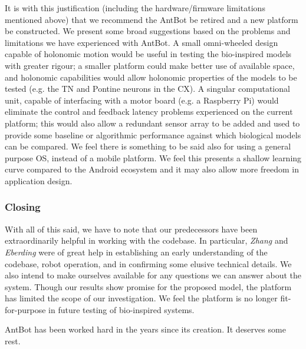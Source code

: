 \documentclass[a4paper,11pt,twoside,openright]{article}
\begin{document}
It is with this justification (including the hardware/firmware
limitations mentioned above) that we recommend the AntBot be retired
and a new platform be constructed. We present some broad suggestions
based on the problems and limitations we have experienced with
AntBot. A small omni-wheeled design capable of holonomic motion would
be useful in testing the bio-inspired models with greater rigour; a
smaller platform could make better use of available space, and
holonomic capabilities would allow holonomic properties of the models
to be tested (e.g. the TN and Pontine neurons in the CX). A singular
computational unit, capable of interfacing with a motor board (e.g. a
Raspberry Pi) would eliminate the control and feedback latency
problems experienced on the current platform; this would also allow a
redundant sensor array to be added and used to provide some baseline
or algorithmic performance against which biological models can be
compared. We feel there is something to be said also for using a
general purpose OS, instead of a mobile platform. We feel this
presents a shallow learning curve compared to the Android
ecosystem and it may also allow more freedom in application design.

\subsubsection{Closing}
With all of this said, we have to note that our predecessors have been
extraordinarily helpful in working with the codebase. In particular,
\textit{Zhang} and \textit{Eberding} were of great help in
establishing an early understanding of the codebase, robot operation,
and in confirming some elusive technical details. We also intend to
make ourselves available for any questions we can answer about the
system. Though our results show promise for the proposed model, the
platform has limited the scope of our investigation. We feel the
platform is no longer fit-for-purpose in future testing of bio-inspired
systems.
\newline\par

AntBot has been worked hard in the years since its creation. It
deserves some rest.
\end{document}
